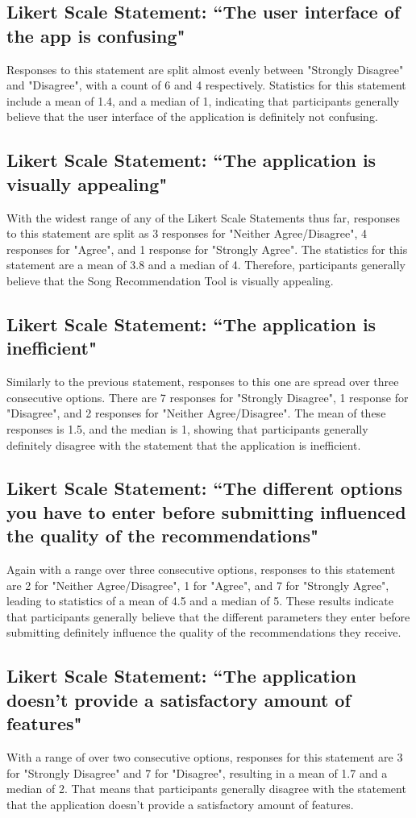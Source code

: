 \documentclass{l4proj}
\begin{document}
\subsection{Likert Scale Statement: ``The user interface of the app is confusing"}
Responses to this statement are split almost evenly between "Strongly Disagree" and "Disagree", with a count of 6 and 4 respectively. Statistics for this statement include a mean of 1.4, and a median of 1, indicating that participants generally believe that the user interface of the application is definitely not confusing.  
\subsection{Likert Scale Statement: ``The application is visually appealing"}
With the widest range of any of the Likert Scale Statements thus far, responses to this statement are split as 3 responses for "Neither Agree/Disagree", 4 responses for "Agree", and 1 response for "Strongly Agree". The statistics for this statement are a mean of 3.8 and a median of 4. Therefore, participants generally believe that the Song Recommendation Tool is visually appealing.
\subsection{Likert Scale Statement: ``The application is inefficient"}
Similarly to the previous statement, responses to this one are spread over three consecutive options. There are 7 responses for "Strongly Disagree", 1 response for "Disagree", and 2 responses for "Neither Agree/Disagree". The mean of these responses is 1.5, and the median is 1, showing that participants generally definitely disagree with the statement that the application is inefficient. 
\subsection{Likert Scale Statement: ``The different options you have to enter before submitting influenced the quality of the recommendations"}
Again with a range over three consecutive options, responses to this statement are 2 for "Neither Agree/Disagree", 1 for "Agree", and 7 for "Strongly Agree", leading to statistics of a mean of 4.5 and a median of 5. These results indicate that participants generally believe that the different parameters they enter before submitting definitely influence the quality of the recommendations they receive.
\subsection{Likert Scale Statement: ``The application doesn't provide a satisfactory amount of features"}
With a range of over two consecutive options, responses for this statement are 3 for "Strongly Disagree" and 7 for "Disagree", resulting in a mean of 1.7 and a median of 2. That means that participants generally disagree with the statement that the application doesn't provide a satisfactory amount of features.
\end{document}
